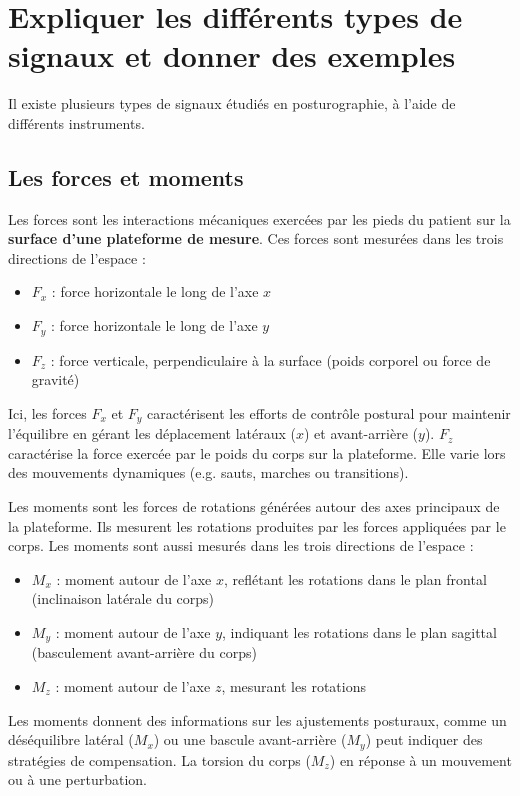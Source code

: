 \section{Expliquer les différents types de signaux et donner des exemples}

Il existe plusieurs types de signaux étudiés en posturographie, à l'aide de différents instruments.

\subsection{Les forces et moments}

Les forces sont les interactions mécaniques exercées par les pieds du patient sur la \textbf{surface d'une plateforme de mesure}.
Ces forces sont mesurées dans les trois directions de l'espace : 
\begin{itemize}
  \item $F_x$ : force horizontale le long de l'axe $x$
  \item $F_y$ : force horizontale le long de l'axe $y$ 
  \item $F_z$ : force verticale, perpendiculaire à la surface (poids corporel ou force de gravité)
\end{itemize}
Ici, les forces $F_x$ et $F_y$ caractérisent les efforts de contrôle postural pour maintenir l'équilibre 
en gérant les déplacement latéraux ($x$) et avant-arrière ($y$).
$F_z$ caractérise la force exercée par le poids du corps sur la plateforme. Elle varie 
lors des mouvements dynamiques (e.g. sauts, marches ou transitions).

Les moments sont les forces de rotations générées autour des axes principaux de la plateforme.
Ils mesurent les rotations produites par les forces appliquées par le corps.
Les moments sont aussi mesurés dans les trois directions de l'espace : 

\begin{itemize}
  \item $M_x$ : moment autour de l'axe $x$, reflétant les rotations dans le plan frontal (inclinaison latérale du corps)
  \item $M_y$ : moment autour de l'axe $y$, indiquant les rotations dans le plan sagittal (basculement avant-arrière du corps)
  \item $M_z$ : moment autour de l'axe $z$, mesurant les rotations 
\end{itemize}

Les moments donnent des informations sur les ajustements posturaux, comme un déséquilibre latéral ($M_x$) 
ou une bascule avant-arrière ($M_y$) peut indiquer des stratégies de compensation. La torsion du corps ($M_z$) en réponse à un mouvement ou à une perturbation.

